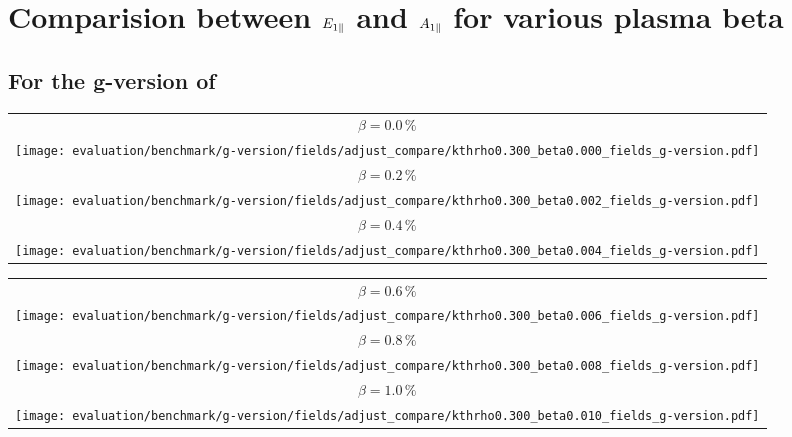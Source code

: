 \section{Comparision between $E_{1\parallel}$ and $A_{1\parallel}$ for various plasma beta}
\label{append:fieldComparision}

\subsection{For the g-version of {\gkw}}
\label{subappend:fieldComparisionGVersion}

\begin{center}
    \begin{tabular}{c}
        $ \beta = 0.0\,\%$ \\
        \texttt{[image: evaluation/benchmark/g-version/fields/adjust\_compare/kthrho0.300\_beta0.000\_fields\_g-version.pdf]} \\
        $ \beta = 0.2\,\%$ \\
        \texttt{[image: evaluation/benchmark/g-version/fields/adjust\_compare/kthrho0.300\_beta0.002\_fields\_g-version.pdf]} \\
        $ \beta = 0.4\,\%$ \\
        \texttt{[image: evaluation/benchmark/g-version/fields/adjust\_compare/kthrho0.300\_beta0.004\_fields\_g-version.pdf]} \\
    \end{tabular}
\end{center}

\begin{center}
    \begin{tabular}{c}
        $ \beta = 0.6\,\%$ \\
        \texttt{[image: evaluation/benchmark/g-version/fields/adjust\_compare/kthrho0.300\_beta0.006\_fields\_g-version.pdf]} \\
        $ \beta = 0.8\,\%$ \\
        \texttt{[image: evaluation/benchmark/g-version/fields/adjust\_compare/kthrho0.300\_beta0.008\_fields\_g-version.pdf]} \\
        $ \beta = 1.0\,\%$ \\
        \texttt{[image: evaluation/benchmark/g-version/fields/adjust\_compare/kthrho0.300\_beta0.010\_fields\_g-version.pdf]} \\
    \end{tabular}
\end{center}


